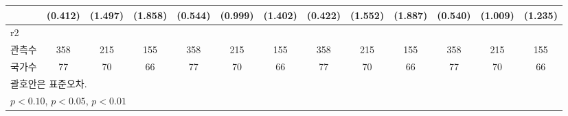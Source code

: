\begin{table}[htbp]
{\begin{tabular}{l*{12}{c}}
                    &     (0.412)         &     (1.497)         &     (1.858)         &     (0.544)         &     (0.999)         &     (1.402)         &     (0.422)         &     (1.552)         &     (1.887)         &     (0.540)         &     (1.009)         &     (1.235)         \\
\hline
r2                  &                     &                     &                     &                     &                     &                     &                     &                     &                     &                     &                     &                     \\
관측수                   &         358         &         215         &         155         &         358         &         215         &         155         &         358         &         215         &         155         &         358         &         215         &         155         \\
국가수                 &          77         &          70         &          66         &          77         &          70         &          66         &          77         &          70         &          66         &          77         &          70         &          66         \\
\hline\hline
\multicolumn{13}{l}{\footnotesize 괄호안은 표준오차.}\\
\multicolumn{13}{l}{\footnotesize \sym{*} \(p<0.10\), \sym{**} \(p<0.05\), \sym{***} \(p<0.01\)}\\
\end{tabular}}
\end{table}
